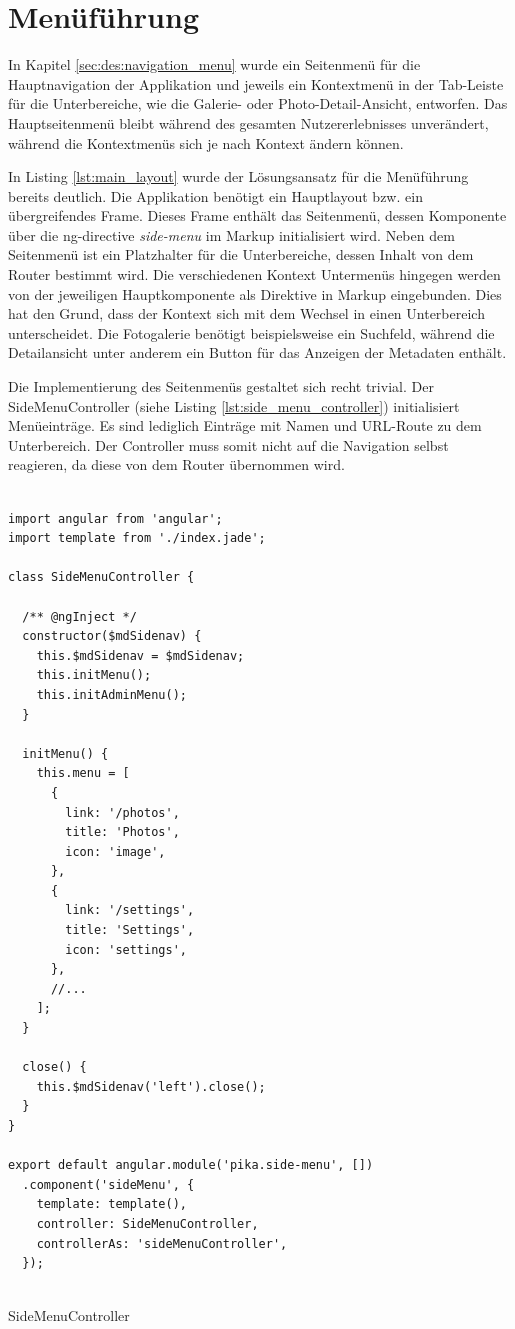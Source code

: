 \section{Menüführung}

In Kapitel \ref{sec:des:navigation_menu} wurde ein Seitenmenü für die Hauptnavigation der Applikation und jeweils ein Kontextmenü in der Tab-Leiste für die Unterbereiche, wie die Galerie- oder Photo-Detail-Ansicht, entworfen. Das Hauptseitenmenü bleibt während des gesamten Nutzererlebnisses unverändert, während die Kontextmenüs sich je nach Kontext ändern können.

In Listing \ref{lst:main_layout} wurde der Lösungsansatz für die Menüführung bereits deutlich. Die Applikation benötigt ein Hauptlayout bzw. ein übergreifendes Frame. Dieses Frame enthält das Seitenmenü, dessen Komponente über die \gls{ng-directive} \textit{side-menu} im Markup initialisiert wird. Neben dem Seitenmenü ist ein Platzhalter für die Unterbereiche, dessen Inhalt von dem Router bestimmt wird. Die verschiedenen Kontext Untermenüs hingegen werden von der jeweiligen Hauptkomponente als Direktive in Markup eingebunden. Dies hat den Grund, dass der Kontext sich mit dem Wechsel in einen Unterbereich unterscheidet. Die Fotogalerie benötigt beispielsweise ein Suchfeld, während die Detailansicht unter anderem ein Button für das Anzeigen der Metadaten enthält.

Die Implementierung des Seitenmenüs gestaltet sich recht trivial. Der SideMenuController (siehe Listing \ref{lst:side_menu_controller}) initialisiert Menüeinträge. Es sind lediglich Einträge mit Namen und URL-Route zu dem Unterbereich. Der Controller muss somit nicht auf die Navigation selbst reagieren, da diese von dem Router übernommen wird.

\begin{listing}[H]
\begin{verbatim}

import angular from 'angular';
import template from './index.jade';

class SideMenuController {

  /** @ngInject */
  constructor($mdSidenav) {
    this.$mdSidenav = $mdSidenav;
    this.initMenu();
    this.initAdminMenu();
  }

  initMenu() {
    this.menu = [
      {
        link: '/photos',
        title: 'Photos',
        icon: 'image',
      },
      {
        link: '/settings',
        title: 'Settings',
        icon: 'settings',
      },
      //...
    ];
  }

  close() {
    this.$mdSidenav('left').close();
  }
}

export default angular.module('pika.side-menu', [])
  .component('sideMenu', {
    template: template(),
    controller: SideMenuController,
    controllerAs: 'sideMenuController',
  });


\end{verbatim}
\caption{SideMenuController}
\label{lst:side_menu_controller}
\end{listing}


